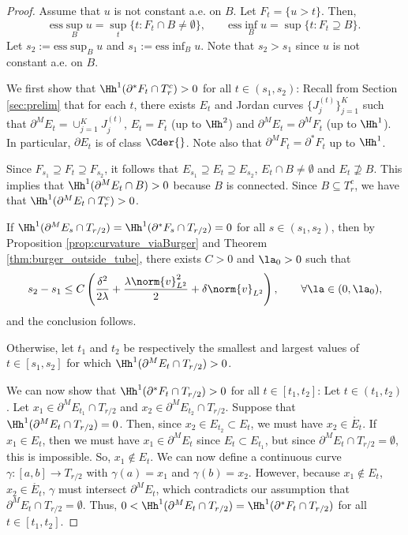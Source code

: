 \begin{proof}
Assume that $u$ is not constant a.e. on $B$. Let $F_t = \{ u> t \}$. Then,
$$
\mathrm{ess}\sup_B u = \sup_t \{ t: F_t \cap B \neq \emptyset \}, \qquad \mathrm{ess}\inf_B u = \sup \{ t: F_t\supseteq B \}.
$$ 
Let $s_2 := \mathrm{ess}\sup_B u$ and $s_1:= \mathrm{ess}\inf_B u$. Note that $s_2>s_1$ since $u$ is not constant a.e. on $B$. 


We first show that $\Hh^1(\partial^* F_{t} \cap T_r^c)>0$ for all $t\in (s_1,s_2)$:  
Recall from Section \ref{sec:prelim} that for each $t$, there exists $E_t$ and Jordan curves $\{J_{j}^{(t)}\}_{j=1}^K$ such that  $\partial^M E_t = \cup_{j=1}^{K}J_{j}^{(t)}$, $E_t = F_t$ (up to $\Hh^2$) and $\partial^M E_t = \partial^M F_t$ (up to $\Hh^1$). In particular, $\partial E_t$ is of class $\Cder{}$.
Note also that $\partial^M F_t = \partial^* F_t$ up to $\Hh^1$.


 Since $F_{s_1}\supseteq F_t \supseteq F_{s_2}$, it follows that $E_{s_1}\supseteq E_t \supseteq E_{s_2}$, $E_t\cap B \neq \emptyset$ and $E_t\not\supseteq B$. This implies that   $\Hh^1(\partial^M E_t \cap B) >0$  because $B$ is connected. Since $B\subseteq T_r^c$, we have that $\Hh^1(\partial^M E_t \cap T_r^c)>0$.


If $\Hh^1(\partial^M E_s\cap T_{r/2})= \Hh^1(\partial^* F_s\cap T_{r/2})=0$ for all $s\in (s_1,s_2)$, then by Proposition \ref{prop:curvature_viaBurger} and Theorem \ref{thm:burger_outside_tube}, there exists $C>0$ and $\la_0>0$ such that
$$
 s_2-s_1 \leq  C\left(\frac{\delta^2}{2\lambda} +\frac{\lambda  \norm{v}_{L^2}^2}{2} + \delta \norm{v}_{L^2}\right), \qquad \forall \la \in (0,\la_0),
$$
and the conclusion follows.


Otherwise, let $t_1$ and $t_2$ be respectively the smallest  and largest values of $ t\in [s_1,s_2]$ for which   $\Hh^1(\partial^M E_t \cap T_{r/2} )>0$. 

We can now show that $\Hh^1(\partial^* F_t \cap T_{r/2} )>0$ for all $t\in [t_1,t_2]$:  Let $t\in (t_1,t_2)$. Let $x_1\in \partial^M E_{t_1} \cap T_{r/2}$ and $x_2\in \partial^M E_{t_2}\cap T_{r/2}$. Suppose that $\Hh^1(\partial^M E_t \cap T_{r/2})=0$. Then, since $x_2\in E_{t_2}\subset E_{t}$, we must have $x_2\in \mathring{E_{t}}$. If $x_1\in E_t$, then we must have $x_1\in \partial^M E_t$ since $E_t\subset E_{t_1}$, but since $\partial^M E_t \cap T_{r/2}=\emptyset$, this is impossible. So, $x_1\not\in E_t$. We can now define a continuous curve $\gamma:[a,b]\to T_{r/2}$ with $\gamma(a) = x_1$ and $\gamma(b) = x_2$. However, because $x_1\not\in E_t$, $x_2 \in \mathring{E_t}$, $\gamma$ must intersect $\partial^M E_t$, which contradicts our assumption that $\partial^M E_t \cap T_{r/2}=\emptyset$.  Thus, $0<\Hh^1(\partial^M E_{t} \cap T_{r/2}) =  \Hh^1(\partial^* F_{t} \cap T_{r/2}) $ for all $t\in [t_1,t_2]$.




\end{proof}

